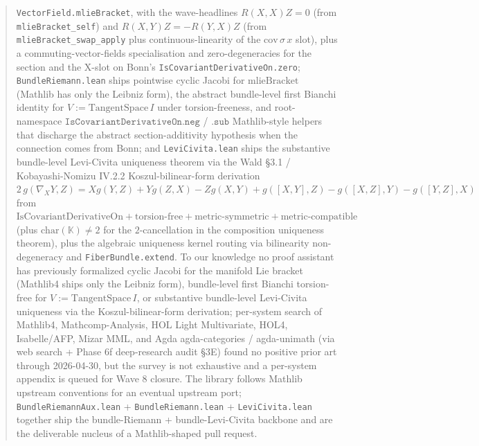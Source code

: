 \documentclass[twocolumn]{revtex4-2}
\begin{document}
\begin{abstract}
\texttt{VectorField.mlieBracket}, with the wave-headlines $R(X, X)Z = 0$
(from \texttt{mlieBracket\_self}) and $R(X, Y)Z = -R(Y, X)Z$ (from
\texttt{mlieBracket\_swap\_apply} plus continuous-linearity of the
$\mathrm{cov}\,\sigma\,x$ slot), plus a commuting-vector-fields
specialisation and zero-degeneracies for the section and the X-slot
on Bonn's \texttt{IsCovariantDerivativeOn.zero};
\texttt{BundleRiemann.lean} ships pointwise cyclic Jacobi for
$\mathrm{mlieBracket}$ (Mathlib has only the Leibniz form), the
abstract bundle-level first Bianchi identity for $V :=
\mathrm{TangentSpace}\,I$ under torsion-freeness, and root-namespace
$\texttt{IsCovariantDerivativeOn.neg}$ / $\texttt{.sub}$ Mathlib-style
helpers that discharge the abstract section-additivity hypothesis when
the connection comes from Bonn; and \texttt{LeviCivita.lean} ships the
substantive bundle-level Levi-Civita uniqueness theorem via the
Wald \S 3.1 / Kobayashi-Nomizu IV.2.2 Koszul-bilinear-form derivation
$2\,g(\nabla_{X}Y, Z) = X g(Y,Z) + Y g(Z,X) - Z g(X,Y)
+ g([X,Y], Z) - g([X,Z], Y) - g([Y,Z], X)$ from
$\mathrm{IsCovariantDerivativeOn} + \mathrm{torsion\text{-}free}
+ \mathrm{metric\text{-}symmetric} + \mathrm{metric\text{-}compatible}$
(plus $\mathrm{char}(\mathbb{K}) \neq 2$ for the $2$-cancellation in
the composition uniqueness theorem), plus the algebraic uniqueness
kernel routing via bilinearity non-degeneracy and
\texttt{FiberBundle.extend}. To our knowledge no proof assistant has
previously formalized cyclic Jacobi for the manifold Lie bracket
(Mathlib4 ships only the Leibniz form), bundle-level first Bianchi
torsion-free for $V := \mathrm{TangentSpace}\,I$, or substantive
bundle-level Levi-Civita uniqueness via the Koszul-bilinear-form
derivation; per-system search of Mathlib4, Mathcomp-Analysis,
HOL Light Multivariate, HOL4, Isabelle/AFP, Mizar MML, and
Agda agda-categories / agda-unimath (via web search +
Phase 6f deep-research audit \S 3E) found no positive prior art
through 2026-04-30, but the survey is not exhaustive and a per-system
appendix is queued for Wave 8 closure. The library
follows Mathlib upstream conventions for an eventual upstream port;
\texttt{BundleRiemannAux.lean} + \texttt{BundleRiemann.lean} +
\texttt{LeviCivita.lean} together ship the bundle-Riemann +
bundle-Levi-Civita backbone and are the deliverable nucleus of a
Mathlib-shaped pull request.
\end{abstract}

\maketitle
\end{document}
